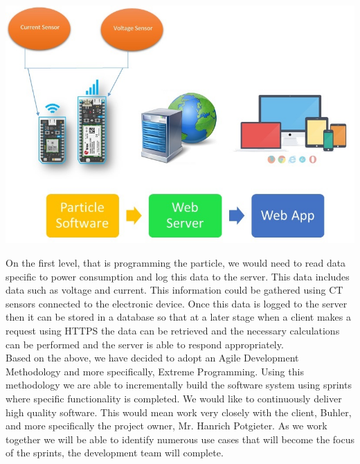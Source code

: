 \documentclass[a4paper,12pt]{article}
\begin{document}
\includegraphics[width=\textwidth]{pcDevMeth.jpg}

On the first level, that is programming the particle, we would need to read data specific to power consumption and log this data to the server. This data includes data such as voltage and current. This information could be gathered using CT sensors connected to the electronic device. Once this data is logged to the server then it can be stored in a database so that at a later stage when a client makes a request using HTTPS the data can be retrieved and the necessary calculations can be performed and the server is able to respond appropriately. \\

Based on the above, we have decided to adopt an Agile Development Methodology and more specifically, Extreme Programming. Using this methodology we are able to incrementally build the software system using sprints where specific functionality is completed. We would like to continuously deliver high quality software. This would mean work very closely with the client, Buhler, and more specifically the project owner, Mr. Hanrich Potgieter. As we work together we will be able to identify numerous use cases that will become the focus of the sprints, the development team will complete. \\
\end{document}
